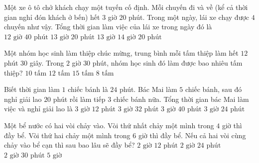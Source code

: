 \begin{ex} %
Một xe ô tô chở khách chạy một tuyến cố định. Mỗi chuyến đi và về (kể cả thời gian nghỉ đón khách ở bến) hết $3$ giờ $20$ phút. Trong một ngày, lái xe chạy được $4$ chuyến như vậy. Tổng thời gian làm việc của lái xe trong ngày đó là
\choice
{$12\text{ giờ } 40\text{ phút}$}
{\True $13\text{ giờ } 20\text{ phút}$}
{$13\text{ giờ}$}
{$14\text{ giờ } 20\text{ phút}$}
\end{ex}

\begin{ex} %
Một nhóm học sinh làm thiệp chúc mừng, trung bình mỗi tấm thiệp làm hết $12$ phút $30$ giây. Trong $2$ giờ $30$ phút, nhóm học sinh đó làm được bao nhiêu tấm thiệp?
\choice
{$10\text{ tấm}$}
{\True $12\text{ tấm}$}
{$15\text{ tấm}$}
{$8\text{ tấm}$}
\end{ex}

\begin{ex} %
Biết thời gian làm $1$ chiếc bánh là $24$ phút. Bác Mai làm $5$ chiếc bánh, sau đó nghỉ giải lao $20$ phút rồi làm tiếp $3$ chiếc bánh nữa. Tổng thời gian bác Mai làm việc và nghỉ giải lao là
\choice
{$3\text{ giờ } 12\text{ phút}$}
{\True $3\text{ giờ } 32\text{ phút}$}
{$3\text{ giờ } 40\text{ phút}$}
{$3\text{ giờ } 24\text{ phút}$}
\end{ex}

\begin{ex} %
Một bể nước có hai vòi chảy vào. Vòi thứ nhất chảy một mình trong $4$ giờ thì đầy bể. Vòi thứ hai chảy một mình trong $6$ giờ thì đầy bể. Nếu cả hai vòi cùng chảy vào bể cạn thì sau bao lâu sẽ đầy bể?
\choice
{$2\text{ giờ } 12\text{ phút}$}
{\True $2\text{ giờ } 24\text{ phút}$}
{$2\text{ giờ } 30\text{ phút}$}
{$5\text{ giờ}$}
\end{ex}


